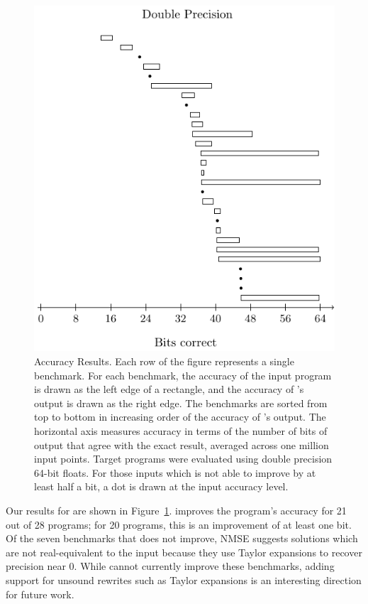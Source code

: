 \documentclass[paper.tex]{subfiles}
\begin{document}
\begin{figure}
  \centering
    \includegraphics[width=0.9\columnwidth]{fig/eval-rect-d.pdf}
    \caption{Accuracy Results. Each row of the figure represents a
      single benchmark. For each benchmark, the accuracy of the input
      program is drawn as the left edge of a rectangle, and the
      accuracy of \casio's output is drawn as the right edge.  The
      benchmarks are sorted from top to bottom in increasing order of
      the accuracy of \casio's output. The horizontal axis measures
      accuracy in terms of the number of bits of output that agree
      with the exact result, averaged across one million input
      points. Target programs were evaluated using double precision
      64-bit floats. For those inputs which \casio is not able to
      improve by at least half a bit, a dot is drawn at the input
      accuracy level. }
  \label{fig:eval-rect}
\end{figure}

 Our results for are shown in
Figure~\ref{fig:eval-rect}.
\casio improves the program's accuracy for 21 out of 28 programs;
for 20 programs, this is an improvement of at least one bit.
Of the seven benchmarks that \casio does not improve,
  NMSE suggests solutions which are not real-equivalent to the input
  because they use Taylor expansions to recover precision near 0. While \casio cannot
currently improve these benchmarks, adding support for unsound
rewrites such as Taylor expansions is an interesting direction for
future work.
\end{document}
